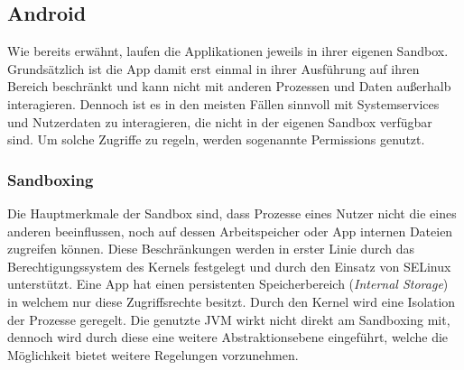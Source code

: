 \subsection{Android}
 \label{sec:SandBoxingNPermissions}
	Wie bereits erwähnt, laufen die Applikationen jeweils in ihrer eigenen Sandbox. Grundsätzlich ist die App damit erst einmal in ihrer Ausführung auf ihren Bereich beschränkt und kann nicht mit anderen Prozessen und Daten außerhalb interagieren. Dennoch ist es in den meisten Fällen sinnvoll mit Systemservices und Nutzerdaten zu interagieren, die nicht in der eigenen Sandbox verfügbar sind. Um solche Zugriffe zu regeln, werden sogenannte Permissions genutzt.
	
	\subsubsection{Sandboxing}
	Die Hauptmerkmale der Sandbox sind, dass Prozesse eines Nutzer nicht die eines anderen beeinflussen, noch auf dessen Arbeitspeicher oder App internen Dateien zugreifen können. Diese Beschränkungen werden in erster Linie durch das Berechtigungssystem des Kernels festgelegt und durch den Einsatz von SELinux unterstützt. Eine App hat einen persistenten Speicherbereich (\textit{Internal Storage}) in welchem nur diese Zugriffsrechte besitzt. Durch den Kernel wird eine Isolation der Prozesse geregelt. Die genutzte JVM wirkt nicht direkt am Sandboxing mit, dennoch wird durch diese eine weitere Abstraktionsebene eingeführt, welche die Möglichkeit bietet weitere Regelungen vorzunehmen. %
	
